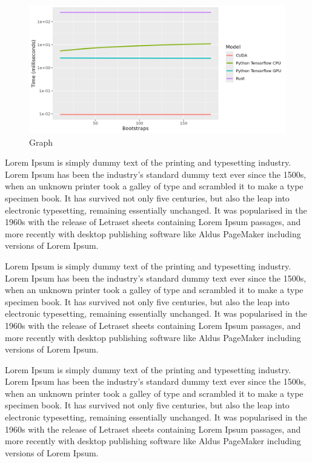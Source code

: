 \documentclass[12pt]{article}
\begin{document}
\begin{figure}[h]
    \includegraphics[width=\linewidth]{bootstraps.png}
    \caption{Graph}
    \label{fig:graph_bootstraps}
\end{figure}

Lorem Ipsum is simply dummy text of the printing and typesetting industry. Lorem Ipsum has been the industry's standard dummy text ever since the 1500s, when an unknown printer took a galley of type and scrambled it to make a type specimen book. It has survived not only five centuries, but also the leap into electronic typesetting, remaining essentially unchanged. It was popularised in the 1960s with the release of Letraset sheets containing Lorem Ipsum passages, and more recently with desktop publishing software like Aldus PageMaker including versions of Lorem Ipsum.

Lorem Ipsum is simply dummy text of the printing and typesetting industry. Lorem Ipsum has been the industry's standard dummy text ever since the 1500s, when an unknown printer took a galley of type and scrambled it to make a type specimen book. It has survived not only five centuries, but also the leap into electronic typesetting, remaining essentially unchanged. It was popularised in the 1960s with the release of Letraset sheets containing Lorem Ipsum passages, and more recently with desktop publishing software like Aldus PageMaker including versions of Lorem Ipsum.

Lorem Ipsum is simply dummy text of the printing and typesetting industry. Lorem Ipsum has been the industry's standard dummy text ever since the 1500s, when an unknown printer took a galley of type and scrambled it to make a type specimen book. It has survived not only five centuries, but also the leap into electronic typesetting, remaining essentially unchanged. It was popularised in the 1960s with the release of Letraset sheets containing Lorem Ipsum passages, and more recently with desktop publishing software like Aldus PageMaker including versions of Lorem Ipsum.
\end{document}
